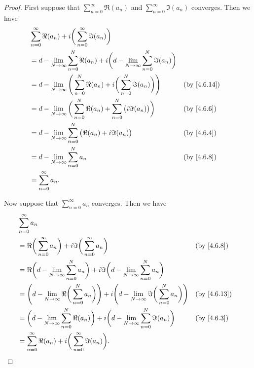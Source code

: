 \begin{proof}
  First suppose that \(\sum_{n = 0}^\infty \Re(a_n)\) and \(\sum_{n = 0}^\infty \Im(a_n)\) converges.
  Then we have
  \begin{align*}
     & \sum_{n = 0}^\infty \Re(a_n) + i \bigg(\sum_{n = 0}^\infty \Im(a_n)\bigg)                                                                        \\
     & = d - \lim_{N \to \infty} \sum_{n = 0}^N \Re(a_n) + i \bigg(d - \lim_{N \to \infty} \sum_{n = 0}^N \Im(a_n)\bigg)                                \\
     & = d - \lim_{N \to \infty} \Bigg(\sum_{n = 0}^N \Re(a_n) + i \bigg(\sum_{n = 0}^N \Im(a_n)\bigg)\Bigg)             &  & \text{(by \cref{4.6.14})} \\
     & = d - \lim_{N \to \infty} \bigg(\sum_{n = 0}^N \Re(a_n) + \sum_{n = 0}^N \big(i \Im(a_n)\big)\bigg)               &  & \by{4.6.6}                \\
     & = d - \lim_{N \to \infty} \sum_{n = 0}^N \big(\Re(a_n) + i \Im(a_n)\big)                                          &  & \by{4.6.4}                \\
     & = d - \lim_{N \to \infty} \sum_{n = 0}^N a_n                                                                      &  & \by{4.6.8}                \\
     & = \sum_{n = 0}^\infty a_n.
  \end{align*}

  Now suppose that \(\sum_{n = 0}^\infty a_n\) converges.
  Then we have
  \begin{align*}
     & \sum_{n = 0}^\infty a_n                                                                                                                                                          \\
     & = \Re\bigg(\sum_{n = 0}^\infty a_n\bigg) + i \Im\bigg(\sum_{n = 0}^\infty a_n\bigg)                                                               &  & \by{4.6.8}                \\
     & = \Re\bigg(d - \lim_{N \to \infty} \sum_{n = 0}^N a_n\bigg) + i \Im\bigg(d - \lim_{N \to \infty} \sum_{n = 0}^N a_n\bigg)                                                        \\
     & = \Bigg(d - \lim_{N \to \infty} \Re\bigg(\sum_{n = 0}^N a_n\bigg)\Bigg) + i \Bigg(d - \lim_{N \to \infty} \Im\bigg(\sum_{n = 0}^N a_n\bigg)\Bigg) &  & \text{(by \cref{4.6.13})} \\
     & = \bigg(d - \lim_{N \to \infty} \sum_{n = 0}^N \Re(a_n)\bigg) + i \bigg(d - \lim_{N \to \infty} \sum_{n = 0}^N \Im(a_n)\bigg)                     &  & \by{4.6.3}                \\
     & = \sum_{n = 0}^\infty \Re(a_n) + i \bigg(\sum_{n = 0}^\infty \Im(a_n)\bigg).
  \end{align*}
\end{proof}

